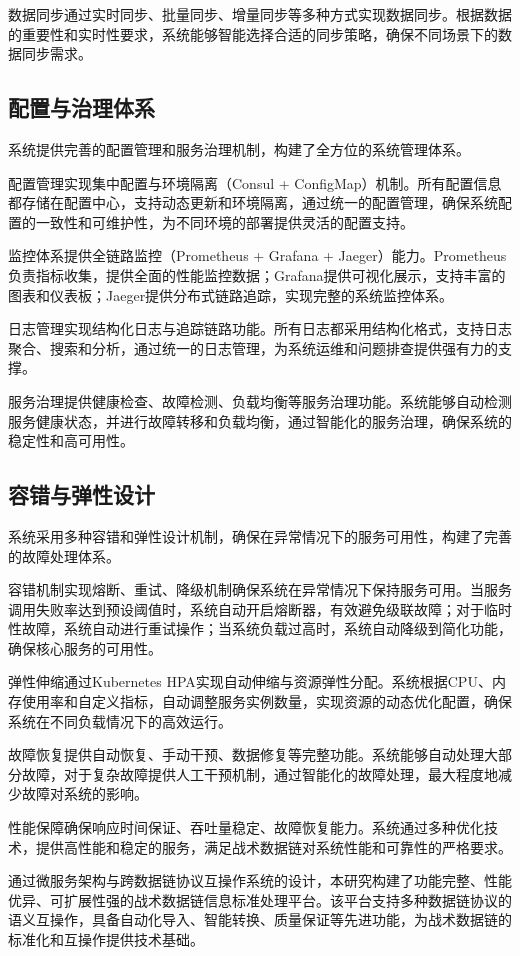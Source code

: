 数据同步通过实时同步、批量同步、增量同步等多种方式实现数据同步。根据数据的重要性和实时性要求，系统能够智能选择合适的同步策略，确保不同场景下的数据同步需求。

\subsection{配置与治理体系}

系统提供完善的配置管理和服务治理机制，构建了全方位的系统管理体系。

配置管理实现集中配置与环境隔离（Consul + ConfigMap）机制。所有配置信息都存储在配置中心，支持动态更新和环境隔离，通过统一的配置管理，确保系统配置的一致性和可维护性，为不同环境的部署提供灵活的配置支持。

监控体系提供全链路监控（Prometheus + Grafana + Jaeger）能力。Prometheus负责指标收集，提供全面的性能监控数据；Grafana提供可视化展示，支持丰富的图表和仪表板；Jaeger提供分布式链路追踪，实现完整的系统监控体系。

日志管理实现结构化日志与追踪链路功能。所有日志都采用结构化格式，支持日志聚合、搜索和分析，通过统一的日志管理，为系统运维和问题排查提供强有力的支撑。

服务治理提供健康检查、故障检测、负载均衡等服务治理功能。系统能够自动检测服务健康状态，并进行故障转移和负载均衡，通过智能化的服务治理，确保系统的稳定性和高可用性。

\subsection{容错与弹性设计}

系统采用多种容错和弹性设计机制，确保在异常情况下的服务可用性，构建了完善的故障处理体系。

容错机制实现熔断、重试、降级机制确保系统在异常情况下保持服务可用。当服务调用失败率达到预设阈值时，系统自动开启熔断器，有效避免级联故障；对于临时性故障，系统自动进行重试操作；当系统负载过高时，系统自动降级到简化功能，确保核心服务的可用性。

弹性伸缩通过Kubernetes HPA实现自动伸缩与资源弹性分配。系统根据CPU、内存使用率和自定义指标，自动调整服务实例数量，实现资源的动态优化配置，确保系统在不同负载情况下的高效运行。

故障恢复提供自动恢复、手动干预、数据修复等完整功能。系统能够自动处理大部分故障，对于复杂故障提供人工干预机制，通过智能化的故障处理，最大程度地减少故障对系统的影响。

性能保障确保响应时间保证、吞吐量稳定、故障恢复能力。系统通过多种优化技术，提供高性能和稳定的服务，满足战术数据链对系统性能和可靠性的严格要求。

通过微服务架构与跨数据链协议互操作系统的设计，本研究构建了功能完整、性能优异、可扩展性强的战术数据链信息标准处理平台。该平台支持多种数据链协议的语义互操作，具备自动化导入、智能转换、质量保证等先进功能，为战术数据链的标准化和互操作提供技术基础。